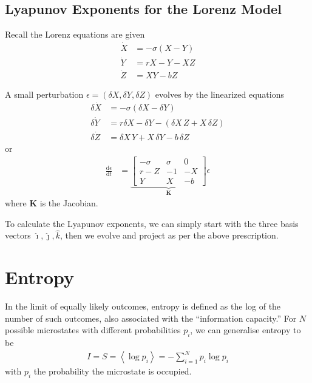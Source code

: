 \documentclass[12pt]{article}
\newcommand{\rd}[2]{\frac{\mathrm{d}#1}{\mathrm{d}#2}}
\newcommand{\expvalue}[1]{\left<#1\right>}
\begin{document}
\subsection{Lyapunov Exponents for the Lorenz Model}

Recall the Lorenz equations are given
\begin{align}
    \dot{X} &= -\sigma(X-Y)\\
    \dot{Y} &= rX - Y - XZ\\
    \dot{Z} &= XY - bZ
\end{align}

A small perturbation $\epsilon = (\delta X, \delta Y, \delta Z)$ evolves by the
linearized equations
\begin{align}
    \delta\dot{X} &= -\sigma(\delta X-\delta Y)\\
    \delta\dot{Y} &= r\delta X - \delta Y - (\delta X\,Z + X\, \delta Z)\\
    \delta\dot{Z} &= \delta X\,Y + X\, \delta Y - b\, \delta Z
\end{align}
or
\begin{align}
    \rd{\epsilon}{t} &= \underbrace{\begin{bmatrix}
        -\sigma & \sigma & 0\\
        r - Z & -1 & -X\\
        Y & X & -b
    \end{bmatrix}}_{\mathbf{K}}\epsilon
\end{align}
where $\mathbf{K}$ is the Jacobian.

To calculate the Lyapunov exponents, we can simply start with the three basis
vectors $\hat{\imath}, \hat{\jmath}, \hat{k}$, then we evolve and project as per
the above prescription.

\clearpage

\section{Entropy}

In the limit of equally likely outcomes, entropy is defined as the log of the
number of such outcomes, also associated with the ``information capacity.'' For
$N$ possible microstates with different probabilities $p_i$, we can generalise
entropy to be
\begin{align}
    I = S = \expvalue{\log p_i} = -\sum\limits_{i=1}^{N}p_i\log p_i
\end{align}
with $p_i$ the probability the microstate is occupied.
\end{document}
